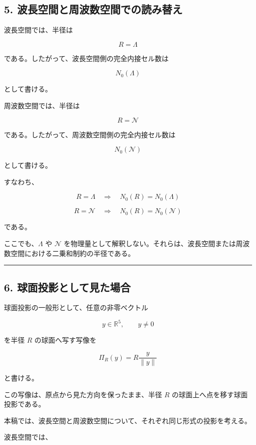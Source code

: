 \documentclass[
]{ltjsarticle}
\begin{document}
\subsection{5.
波長空間と周波数空間での読み替え}\label{ux6ce2ux9577ux7a7aux9593ux3068ux5468ux6ce2ux6570ux7a7aux9593ux3067ux306eux8aadux307fux66ffux3048}

波長空間では、半径は

\[
R=\Lambda
\]

である。したがって、波長空間側の完全内接セル数は

\[
N_0(\Lambda)
\]

として書ける。

周波数空間では、半径は

\[
R=\mathcal{N}
\]

である。したがって、周波数空間側の完全内接セル数は

\[
N_0(\mathcal{N})
\]

として書ける。

すなわち、

\[
R=\Lambda
\quad\Rightarrow\quad
N_0(R)=N_0(\Lambda)
\]

\[
R=\mathcal{N}
\quad\Rightarrow\quad
N_0(R)=N_0(\mathcal{N})
\]

である。

ここでも、\(\Lambda\) や \(\mathcal{N}\)
を物理量として解釈しない。それらは、波長空間または周波数空間における二乗和制約の半径である。

\begin{center}\rule{0.5\linewidth}{0.5pt}\end{center}

\subsection{6.
球面投影として見た場合}\label{ux7403ux9762ux6295ux5f71ux3068ux3057ux3066ux898bux305fux5834ux5408}

球面投影の一般形として、任意の非零ベクトル

\[
y\in\mathbb{R}^5,\qquad y\ne0
\]

を半径 \(R\) の球面へ写す写像を

\[
\Pi_R(y)=R\frac{y}{\|y\|}
\]

と書ける。

この写像は、原点から見た方向を保ったまま、半径 \(R\)
の球面上へ点を移す球面投影である。

本稿では、波長空間と周波数空間について、それぞれ同じ形式の投影を考える。

波長空間では、
\end{document}
